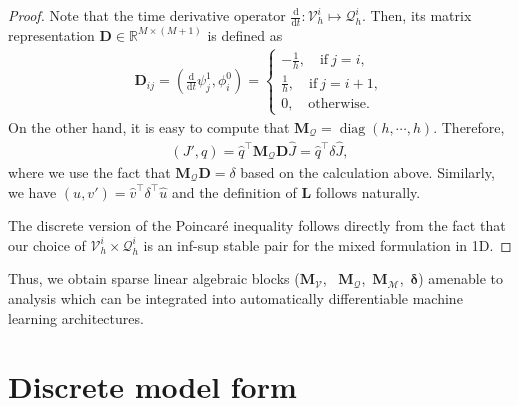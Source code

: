 \documentclass[12pt]{article}
\begin{document}
\begin{proof}
Note that the time derivative operator $\frac{\mathrm{d}}{\mathrm{d}t} : \mathcal{V}_h^i \mapsto \mathcal{Q}_h^i$.  Then, its matrix representation $\mathbf{D} \in \mathbb{R}^{M \times (M+1)}$ is defined as 
\begin{align*}
\mathbf{D}_{ij} = (\frac{\mathrm{d}}{\mathrm{d}t}\psi_j^1, \phi_i^0) = 
\begin{cases}
-\frac{1}{h}, \quad  \text{if} \ j = i,  \\
\frac{1}{h}, \quad  \text{if} \ j=i+1, \\
0, \quad \text{otherwise.}
\end{cases}
\end{align*}
On the other hand, it is easy to compute that $\mathbf{M}_{\mathcal{Q}} = \operatorname{diag}(h, \cdots, h)$. Therefore, 
\begin{align*}
	(J', q) = \hat{q}^{\intercal} \mathbf{M}_{\mathcal{Q}} \mathbf{D} \hat{J} = \hat{q}^{\intercal} \delta \hat{J},
\end{align*} 
where we use the fact that $\mathbf{M}_{\mathcal{Q}} \mathbf{D} = \delta$ based on the calculation above.  Similarly, we have $(u, v') = \hat{v}^{\intercal}\delta^{\intercal} \hat{u}$ and the definition of $\mathbf{L}$ follows naturally.  

The discrete version of the Poincar\'e inequality follows directly from the fact that our choice of $\mathcal{V}_h^i \times \mathcal{Q}_h^i$ is an inf-sup stable pair for the mixed formulation in 1D. 
\end{proof}

Thus, we obtain sparse linear algebraic blocks ($\mathbf{M}_\mathcal{V}$, \, $\mathbf{M}_\mathcal{Q}$,\, $\mathbf{M}_\mathcal{M}$,\, $\mathbf{\delta}$) amenable to analysis which can be integrated into automatically differentiable machine learning architectures.

\section{Discrete model form}
\label{app:discrete_model}
\end{document}
